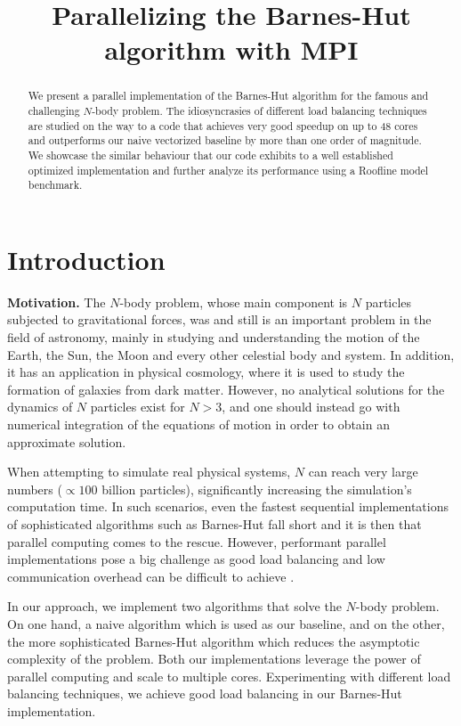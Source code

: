 \documentclass[letterpaper]{article}
\title{Parallelizing the Barnes-Hut algorithm with MPI}
\newcommand{\mypar}[1]{{\bf #1.}}
\begin{document}
%
\maketitle
%
\begin{abstract}
We present a parallel implementation of the Barnes-Hut algorithm for the famous and challenging $N$-body problem. The idiosyncrasies of different load balancing techniques are studied on the way to a code that achieves very good speedup on up to 48 cores and outperforms our naive vectorized baseline by more than one order of magnitude. We showcase the similar behaviour that our code exhibits to a well established optimized implementation and further analyze its performance using a Roofline model benchmark.

\end{abstract}

\section{Introduction}\label{sec:intro}
\mypar{Motivation} The $N$-body problem, whose main component is $N$ particles subjected to gravitational forces, was and still is an important problem in the field of astronomy, mainly in studying and understanding the motion of the Earth, the Sun, the Moon and every other celestial body and system. In addition, it has an application in physical cosmology, where it is used to study the formation of galaxies from dark matter. However, no analytical solutions for the dynamics of $N$ particles exist for $N {>} 3$, and one should instead go with numerical integration of the equations of motion in order to obtain an approximate solution.

When attempting to simulate real physical systems, $N$ can reach very large numbers ($\propto 100$ billion particles), significantly increasing the simulation's computation time. In such scenarios, even the fastest sequential implementations of sophisticated algorithms such as Barnes-Hut \cite{BarnesHut} fall short and it is then that parallel computing comes to the rescue. However, performant parallel implementations pose a big challenge as good load balancing and low communication overhead can be difficult to achieve \cite{BHchallenges}.

In our approach, we implement two algorithms that solve the $N$-body problem. On one hand, a naive algorithm which is used as our baseline, and on the other, the more sophisticated Barnes-Hut algorithm which reduces the asymptotic complexity of the problem. Both our implementations leverage the power of parallel computing and scale to multiple cores. Experimenting with different load balancing techniques, we achieve good load balancing in our Barnes-Hut implementation.
\end{document}
